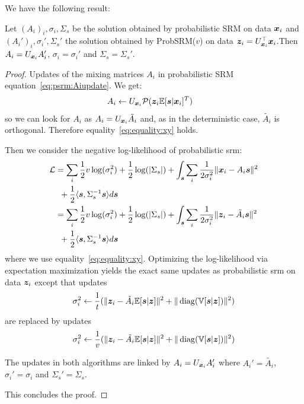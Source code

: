 We have the following result:
\begin{prop}
  Let $(A_i)_i, \sigma_i, \Sigma_s$ be the solution obtained by probabilistic SRM on data
  $\boldsymbol{x}_i$ and $(A_i')_i, \sigma_i', \Sigma_s'$ the solution obtained by ProbSRM($v$) on
  data $\boldsymbol{z}_i = U_{\boldsymbol{x}_i}^{\top} \boldsymbol{x}_i$.Then $A_i = U_{\boldsymbol{x}_i}A_i'$, $\sigma_i =
  \sigma_i'$ and $\Sigma_s = \Sigma_s'$. 
  \label{prop:optimalprobsrm}
\end{prop}
\begin{proof}
  Updates of the mixing matrices $A_i$ in probabilistic SRM equation~\eqref{eq:psrm:Aiupdate}. We get:
  \begin{align}
    A_i &\leftarrow U_{\boldsymbol{x}_i}\mathcal{P}(\boldsymbol{z}_i \mathbb{E}[\boldsymbol{s}| \boldsymbol{x}_i]^T)
    \label{eq:fastprobsrm:Aiupdate}
  \end{align}
  so we can look for $A_i$ as $A_i = U_{\boldsymbol{x}_i} \tilde{A_i}$ and, as in the
  deterministic case, $\tilde{A_i}$ is orthogonal.
  Therefore equality~\eqref{eq:equality:xy} holds.
  
  Then we consider the negative log-likelihood of probabilistic srm:
  \begin{align}
    \mathcal{L} &= \sum_i \frac12 v\log(\sigma_i^2) + \frac12 \log(|\Sigma_s|) + \int_{\boldsymbol{s}} \sum_i \frac1{2 \sigma_i^{2}}\|\boldsymbol{x}_i - A_i \boldsymbol{s} \|^2 \\& \enspace + \frac12 \langle \boldsymbol{s} , \Sigma_s^{-1} \boldsymbol{s} \rangle  d\boldsymbol{s} \\
          &= \sum_i \frac12 v \log(\sigma_i^2) + \frac12 \log(|\Sigma_s|) + \int_{\boldsymbol{s}} \sum_i \frac1{2 \sigma_i^{2}}\|\boldsymbol{z}_i - \tilde{A_i} \boldsymbol{s} \|^2 \\& \enspace+ \frac12 \langle \boldsymbol{s} , \Sigma_s^{-1} \boldsymbol{s} \rangle  d\boldsymbol{s}
  \end{align}
  where we use equality~\eqref{eq:equality:xy}.
  Optimizing the log-likelihood via expectation maximization yields the exact
  same updates as probabilistic srm on data $\boldsymbol{z}_i$
  except that updates
  \begin{align}
    \sigma_i^2 \leftarrow \frac1{t} (\| \boldsymbol{z}_i - \tilde{A_i} \mathbb{E}[\boldsymbol{s}|\boldsymbol{z}]\|^2 + \| \operatorname*{diag}(\mathbb{V}[\boldsymbol{s} | \boldsymbol{z}]) \|^2)
  \end{align}
  are replaced by updates
  \begin{align}
    \sigma_i^2 \leftarrow \frac1{v} (\| \boldsymbol{z}_i - \tilde{A_i} \mathbb{E}[\boldsymbol{s}|\boldsymbol{z}]\|^2 + \| \operatorname*{diag}(\mathbb{V}[\boldsymbol{s} | \boldsymbol{z}]) \|^2)
  \end{align}

  The updates in both algorithms are linked  by $A_i = U_{\boldsymbol{x}_i}A_i'$ where
  $A_i' = \tilde{A_i}$, $\sigma_i' =
  \sigma_i$ and $\Sigma_s'  = \Sigma_s$.

  This concludes the proof.
\end{proof}

